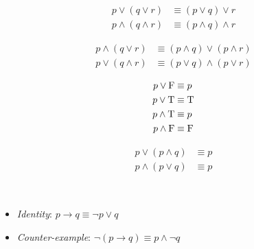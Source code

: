 \begin{definition}
\begin{align}
    p \lor (q \lor r) &\equiv (p \lor q) \lor r \\
    p \land (q \land r) &\equiv (p \land q) \land r
\end{align}
\end{definition}

\begin{definition}
\begin{align}
    p \land (q \lor r) &\equiv (p \land q) \lor (p \land r) \\
    p \lor (q \land r) &\equiv (p \lor q) \land (p \lor r)
\end{align}
\end{definition}

\begin{definition}
\begin{align}
    p \lor \mathrm{F} &\equiv p \\
    p \lor \mathrm{T} &\equiv \mathrm{T} \\
    p \land \mathrm{T} &\equiv p \\
    p \land \mathrm{F} &\equiv \mathrm{F}
\end{align}
\end{definition}

\begin{definition}
\begin{align}
    p \lor (p \land q) &\equiv p \\
    p \land (p \lor q) &\equiv p
\end{align}
\end{definition}

\begin{definition}\ \\
\begin{itemize}
    \item \textit{Identity}: $p \to q \equiv \neg p \lor q$
    \item \textit{Counter-example}: $\neg(p \to q) \equiv p \land \neg q$
\end{itemize}
\end{definition}